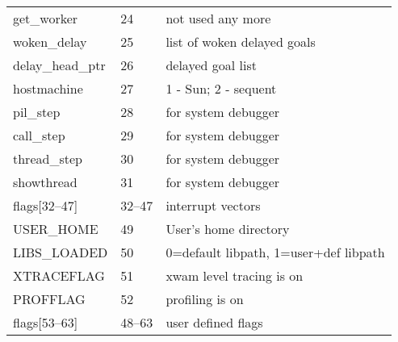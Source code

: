 \documentclass[11pt]{article}
\begin{document}
\begin{center}
\begin{tabular}{l|l|l}
get\_worker	& 24	    & not used any more			\\
woken\_delay	& 25	    & list of woken delayed goals \\
delay\_head\_ptr& 26	    & delayed goal list \\
hostmachine	& 27	    & 1 - Sun; 2 - sequent		\\
pil\_step	& 28	    & for system debugger		\\
call\_step	& 29	    & for system debugger		\\
thread\_step	& 30	    & for system debugger		\\
showthread	& 31	    & for system debugger		\\
flags[32--47]	& 32--47    & interrupt vectors			\\
USER\_HOME	& 49	    & User's home directory		\\
LIBS\_LOADED	& 50	    & 0=default libpath, 1=user+def libpath \\
XTRACEFLAG      & 51	    & xwam level tracing is on		\\
PROFFLAG        & 52	    & profiling is on			\\
flags[53--63]	& 48--63    & user defined flags \\
\hline
\end{tabular}
\end{center}
\end{document}
